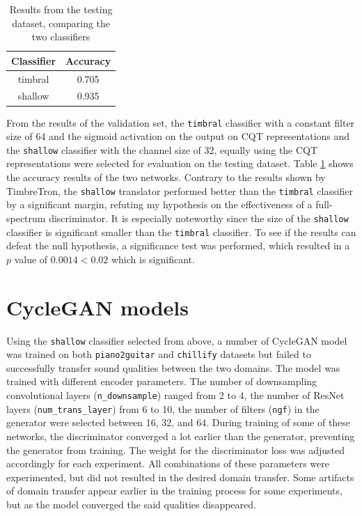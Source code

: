 \documentclass[12pt,a4paper,]{report}
\begin{document}
\begin{table}[]
\begin{tabular}{cc}
\hline
Classifier & Accuracy \\ \hline
timbral    & 0.705     \\
shallow    & 0.935   \\ \hline
\end{tabular}
\centering
\caption{Results from the testing dataset, comparing the two classifiers} \label{tab:classifier}
\end{table}

From the results of the validation set, the \texttt{timbral} classifier
with a constant filter size of 64 and the sigmoid activation on the
output on CQT representations and the \texttt{shallow} classifier with
the channel size of 32, equally using the CQT representations were
selected for evaluation on the testing dataset. Table
\ref{tab:classifier} shows the accuracy results of the two networks.
Contrary to the results shown by TimbreTron, the \texttt{shallow}
translator performed better than the \texttt{timbral} classifier by a
significant margin, refuting my hypothesis on the effectiveness of a
full-spectrum discriminator. It is especially noteworthy since the size
of the \texttt{shallow} classifier is significant smaller than the
\texttt{timbral} classifier. To see if the results can defeat the null
hypothesis, a significance test was performed, which resulted in a \(p\)
value of \(0.0014 < 0.02\) which is significant.

\hypertarget{cyclegan-models}{%
\section{CycleGAN models}\label{cyclegan-models}}

Using the \texttt{shallow} classifier selected from above, a number of
CycleGAN model was trained on both \texttt{piano2guitar} and
\texttt{chillify} datasets but failed to successfully transfer sound
qualities between the two domains. The model was trained with different
encoder parameters. The number of downsampling convolutional layers
(\texttt{n\_downsample}) ranged from 2 to 4, the number of ResNet layers
(\texttt{num\_trans\_layer}) from 6 to 10, the number of filters
(\texttt{ngf}) in the generator were selected between 16, 32, and 64.
During training of some of these networks, the discriminator converged a
lot earlier than the generator, preventing the generator from training.
The weight for the discriminator loss was adjusted accordingly for each
experiment. All combinations of these parameters were experimented, but
did not resulted in the desired domain transfer. Some artifacts of
domain transfer appear earlier in the training process for some
experiments, but as the model converged the said qualities disappeared.
\end{document}
